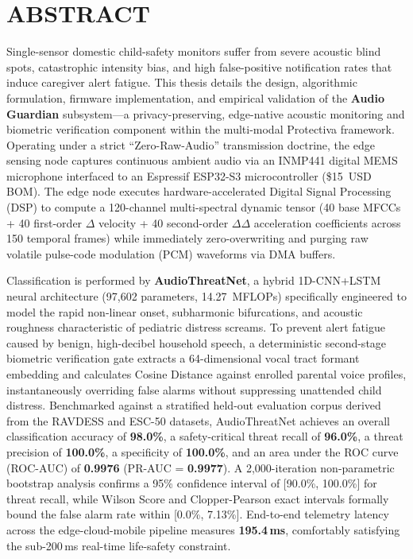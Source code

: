 \documentclass[12pt, a4paper]{report}
\begin{document}
\clearpage

\chapter*{ABSTRACT}
Single-sensor domestic child-safety monitors suffer from severe acoustic blind spots, catastrophic intensity bias, and high false-positive notification rates that induce caregiver alert fatigue. This thesis details the design, algorithmic formulation, firmware implementation, and empirical validation of the \textbf{Audio Guardian} subsystem---a privacy-preserving, edge-native acoustic monitoring and biometric verification component within the multi-modal Protectiva framework. Operating under a strict ``Zero-Raw-Audio'' transmission doctrine, the edge sensing node captures continuous ambient audio via an INMP441 digital MEMS microphone interfaced to an Espressif ESP32-S3 microcontroller (\$15~USD BOM). The edge node executes hardware-accelerated Digital Signal Processing (DSP) to compute a 120-channel multi-spectral dynamic tensor (40 base MFCCs + 40 first-order $\Delta$ velocity + 40 second-order $\Delta\Delta$ acceleration coefficients across 150 temporal frames) while immediately zero-overwriting and purging raw volatile pulse-code modulation (PCM) waveforms via DMA buffers. 

Classification is performed by \textbf{AudioThreatNet}, a hybrid 1D-CNN+LSTM neural architecture (97,602 parameters, 14.27~MFLOPs) specifically engineered to model the rapid non-linear onset, subharmonic bifurcations, and acoustic roughness characteristic of pediatric distress screams. To prevent alert fatigue caused by benign, high-decibel household speech, a deterministic second-stage biometric verification gate extracts a 64-dimensional vocal tract formant embedding and calculates Cosine Distance against enrolled parental voice profiles, instantaneously overriding false alarms without suppressing unattended child distress. Benchmarked against a stratified held-out evaluation corpus derived from the RAVDESS and ESC-50 datasets, AudioThreatNet achieves an overall classification accuracy of \textbf{98.0\%}, a safety-critical threat recall of \textbf{96.0\%}, a threat precision of \textbf{100.0\%}, a specificity of \textbf{100.0\%}, and an area under the ROC curve (ROC-AUC) of \textbf{0.9976} (PR-AUC = \textbf{0.9977}). A 2,000-iteration non-parametric bootstrap analysis confirms a 95\% confidence interval of [90.0\%, 100.0\%] for threat recall, while Wilson Score and Clopper-Pearson exact intervals formally bound the false alarm rate within [0.0\%, 7.13\%]. End-to-end telemetry latency across the edge-cloud-mobile pipeline measures \textbf{195.4\,ms}, comfortably satisfying the sub-200\,ms real-time life-safety constraint. \\
\end{document}
